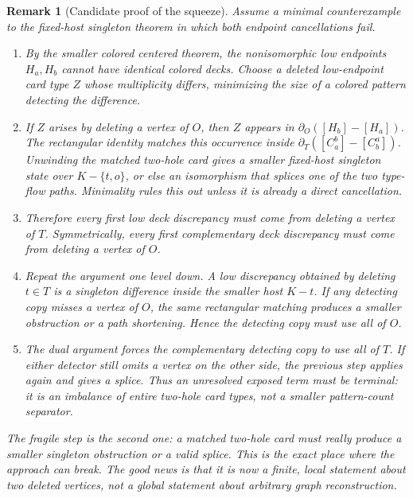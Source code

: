 \documentclass[11pt]{article}
\newtheorem{remark}{Remark}
\begin{document}
\begin{remark}[Candidate proof of the squeeze]
Assume a minimal counterexample to the fixed-host singleton theorem in which
both endpoint cancellations fail.

\begin{enumerate}[leftmargin=2em]
  \item By the smaller colored centered theorem, the nonisomorphic low
  endpoints \(H_a,H_b\) cannot have identical colored decks.  Choose a
  deleted low-endpoint card type \(Z\) whose multiplicity differs, minimizing
  the size of a colored pattern detecting the difference.

  \item If \(Z\) arises by deleting a vertex of \(O\), then \(Z\) appears in
  \(\partial_O([H_b]-[H_a])\).  The rectangular identity matches this
  occurrence inside \(\partial_T([C_a^b]-[C_b^a])\).  Unwinding the matched
  two-hole card gives a smaller fixed-host singleton state over
  \(K-\{t,o\}\), or else an isomorphism that splices one of the two type-flow
  paths.  Minimality rules this out unless it is already a direct
  cancellation.

  \item Therefore every first low deck discrepancy must come from deleting a
  vertex of \(T\).  Symmetrically, every first complementary deck discrepancy
  must come from deleting a vertex of \(O\).

  \item Repeat the argument one level down.  A low discrepancy obtained by
  deleting \(t\in T\) is a singleton difference inside the smaller host
  \(K-t\).  If any detecting copy misses a vertex of \(O\), the same
  rectangular matching produces a smaller obstruction or a path shortening.
  Hence the detecting copy must use all of \(O\).

  \item The dual argument forces the complementary detecting copy to use all
  of \(T\).  If either detector still omits a vertex on the other side, the
  previous step applies again and gives a splice.  Thus an unresolved exposed
  term must be terminal: it is an imbalance of entire two-hole card types, not
  a smaller pattern-count separator.
\end{enumerate}

The fragile step is the second one: a matched two-hole card must really
produce a smaller singleton obstruction or a valid splice.  This is the exact
place where the approach can break.  The good news is that it is now a
finite, local statement about two deleted vertices, not a global statement
about arbitrary graph reconstruction.
\end{remark}
\end{document}
